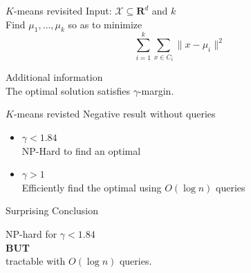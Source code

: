 \documentclass{beamer}
\newcommand{\mc}{\mathcal}
\newcommand{\mb}{\mathbf}
\begin{document}
\begin{frame}{$K$-means revisited}
	Input: $\mc X \subseteq \mb R^d$ and $k$\\
	\vspace{0.5cm}Find $\mu_1, \ldots, \mu_k$ so as to minimize
	$$\sum_{i=1}^k \sum_{x \in C_i} \|x - \mu_i\|^2$$
	
	\vspace{1cm}\alert{Additional information}\\
	\vspace{0.5cm} The optimal solution satisfies $\gamma$-margin.
\end{frame}

\begin{frame}{$K$-means revisted}
	\alert{Negative result without queries} 
	\vspace{0.5cm}
    \begin{itemize}
	    \item $\gamma < 1.84$ \\
	    \vspace{0.3cm} {NP-Hard to find an optimal}
	\end{itemize}

	\vspace{1cm}\color{blue}{Positive result with queries} 
	\vspace{0.5cm}
    \begin{itemize}
	    \item $\gamma > 1$ \\
	    \vspace{0.3cm} {Efficiently find the optimal using $O(\log n)$ queries}
	\end{itemize}
\end{frame}

\begin{frame}{Surprising Conclusion}

    \begin{block}{}
    \begin{center}{\Large NP-hard for $\gamma<1.84$\\
      \vspace{0.2cm}\textbf{BUT} \\
      \vspace{0.3cm}tractable with $O(\log n)$ queries.}
    \end{center}
    \end{block}
\end{frame}
\end{document}
